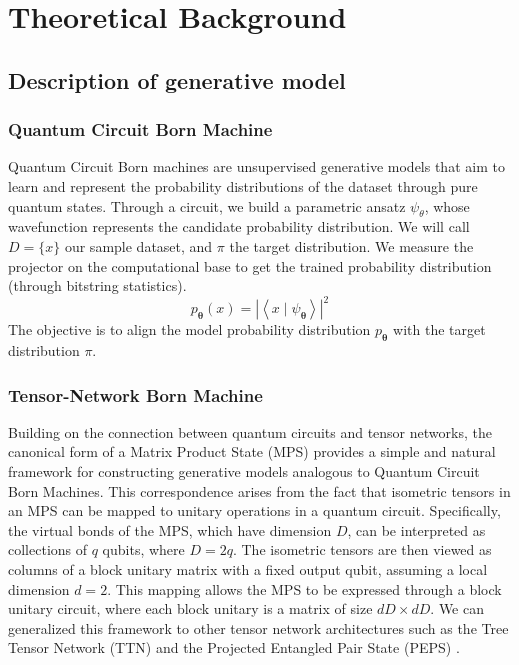 \chapter{Theoretical Background}

\section{Description of generative model}

\subsection{Quantum Circuit Born Machine}
Quantum Circuit Born machines are unsupervised generative models that aim to learn and represent the probability distributions of the dataset through pure quantum states. Through a circuit, we build a parametric ansatz $\psi_{\theta}$, whose wavefunction represents the candidate probability distribution. We will call $D = \{x\}$ our sample dataset, and $\pi$ the target distribution. We measure the projector on the computational base to get the trained probability distribution (through bitstring statistics).
\[ p_{\boldsymbol{\theta}}(x)=\left|\left\langle x \mid \psi_{\boldsymbol{\theta}}\right\rangle\right|^2\]
The objective is to align the model probability distribution $p_{\boldsymbol{\theta}}$ with the target distribution $\pi$.

\subsection{Tensor-Network Born Machine}
Building on the connection between quantum circuits and tensor networks, the canonical form of a Matrix Product State (MPS) provides a simple and natural framework for constructing generative models analogous to Quantum Circuit Born Machines. This correspondence arises from the fact that isometric tensors in an MPS can be mapped to unitary operations in a quantum circuit. Specifically, the virtual bonds of the MPS, which have dimension $D$, can be interpreted as collections of $q$ qubits, where $D=2q$. The isometric tensors are then viewed as columns of a block unitary matrix with a fixed output qubit, assuming a local dimension $d=2$. This mapping allows the MPS to be expressed through a block unitary circuit, where each block unitary is a matrix of size $dD\times dD$. We can generalized this framework to other tensor network architectures such as the Tree Tensor Network (TTN) and the Projected Entangled Pair State (PEPS) \cite{haghshenas_variational_2022}. \\

